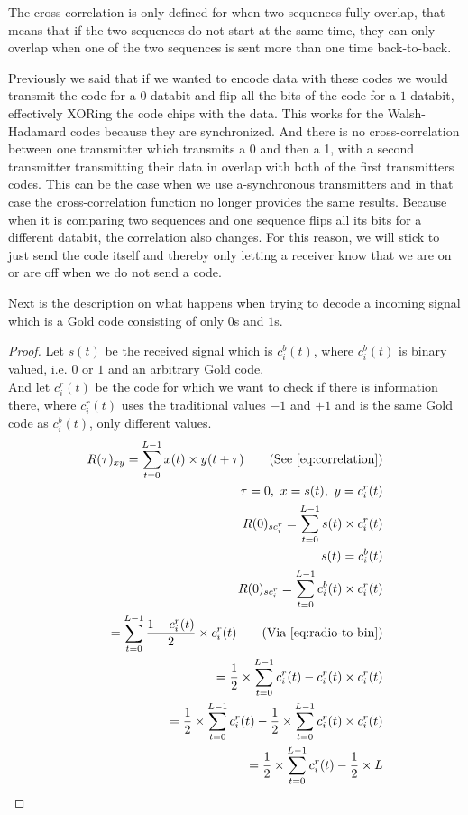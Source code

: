 		The cross-correlation is only defined for when two sequences fully overlap, that means that if the two sequences do not start at the same time, they can only overlap when one of the two sequences is sent more than one time back-to-back.

		Previously we said that if we wanted to encode data with these codes we would transmit the code for a $0$ databit and flip all the bits of the code for a $1$ databit, effectively XORing the code chips with the data.
		This works for the Walsh-Hadamard codes because they are synchronized. 
		And there is no cross-correlation between one transmitter which transmits a 0 and then a 1, with a second transmitter transmitting their data in overlap with both of the first transmitters codes.
		This can be the case when we use a-synchronous transmitters and in that case the cross-correlation function no longer provides the same results.
		Because when it is comparing two sequences and one sequence flips all its bits for a different databit, the correlation also changes. 
		For this reason, we will stick to just send the code itself and thereby only letting a receiver know that we are on or are off when we do not send a code.

		Next is the description on what happens when trying to decode a incoming signal which is a Gold code consisting of only $0$s and $1$s.

		\begin{proof}
			Let $s(t)$ be the received signal which is $c^b_i(t)$, where $c^b_i(t)$ is binary valued, i.e. $0$ or $1$ and an arbitrary Gold code.\\
			And let $c^r_i(t)$ be the code for which we want to check if there is information there, where $c^r_i(t)$ uses the traditional values $-1$ and $+1$ and is the same Gold code as $c^b_i(t)$, only different values. \\

			\begin{align*}
				R(\tau)_{xy} = \displaystyle\sum_{t = 0} ^ {L - 1} x(t) \times y(t + \tau)	\tag{See \autoref{eq:correlation}}
				\\ \tau = 0,\ x = s(t),\ y = c^r_i(t)	
				\\ R(0)_{sc^r_{i}} = \displaystyle\sum_{t = 0} ^ {L - 1} s(t) \times c^r_i(t)	
				\\ s(t) = c^b_i(t) 									
				\\ R(0)_{sc^r_{i}} = \displaystyle\sum_{t = 0} ^ {L - 1} c^b_i(t) \times c^r_i(t)
				\\ = \displaystyle\sum_{t = 0} ^ {L - 1} \frac{1 - c^r_i(t)}{2} \times c^r_i(t) \tag{Via \autoref{eq:radio-to-bin}}
				\\ = \frac{1}{2} \times \displaystyle\sum_{t = 0} ^ {L - 1} c^r_i(t) - c^r_i(t) \times c^r_i(t)
				\\ = \frac{1}{2} \times \displaystyle\sum_{t = 0} ^ {L - 1} c^r_i(t) - \frac{1}{2} \times \displaystyle\sum_{t = 0} ^ {L - 1} c^r_i(t) \times c^r_i(t)
				\\ = \frac{1}{2} \times \displaystyle\sum_{t = 0} ^ {L - 1} c^r_i(t) - \frac{1}{2} \times L
			\end{align*}

		\end{proof}

